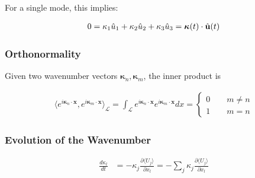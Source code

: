 \documentclass[paper=a4, fontsize=11pt]{scrartcl} %
\numberwithin{equation}{section} %
\numberwithin{figure}{section} %
\numberwithin{table}{section} %
\begin{document}
For a single mode, this implies:

\begin{align} 
    0 = \kappa_1 \hat{u}_1 + \kappa_2 \hat{u}_2 + \kappa_3 \hat{u}_3 
      = \bm{\kappa}(t) \cdot \hat{\bold{u}}(t)
      \label{zdiv}
\end{align}


\subsubsection{Orthonormality} 
Given two wavenumber vectors $\bm{\kappa}_n, \bm{\kappa}_m$, the inner product is

\begin{align}
    \langle e^{i \bm{\kappa}_n \cdot \bm{x}}, e^{i \bm{\kappa}_m \cdot \bm{x}} \rangle_{\mathcal{L}}
    = \int_{\mathcal{L}} e^{i \bm{\kappa}_n \cdot \bm{x}}  e^{i \bm{\kappa}_m \cdot \bm{x}} dx
    = \left\{
    \begin{matrix} 
        0 \qquad m \neq n \\
        1 \qquad m = n
    \end{matrix} \right.
\end{align}

\subsubsection{Evolution of the Wavenumber}

\begin{align}
    \frac{d \kappa_l}{dt} &= -\kappa_j \frac{\partial \langle U_j \rangle}{\partial x_l}
                           = - \sum_j \kappa_j \frac{\partial \langle U_j \rangle}{\partial x_l}
\end{align}
\end{document}
